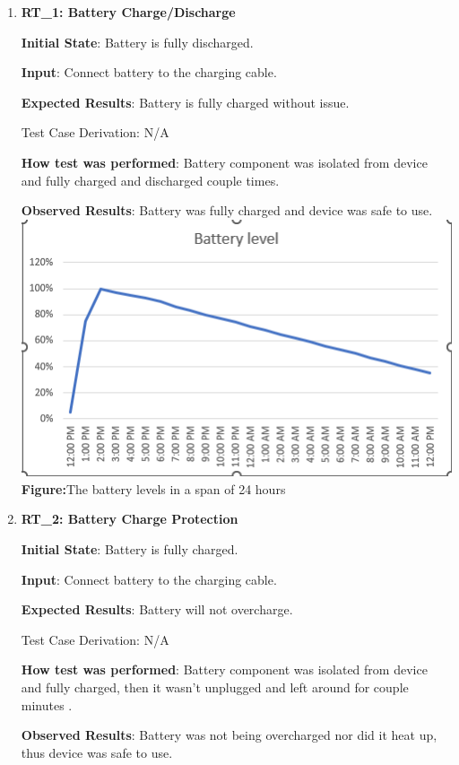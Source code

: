 \documentclass[12pt, titlepage]{article}
\begin{document}
\begin{enumerate}


  \item{\textbf{RT\_1: Battery Charge/Discharge}}\label{RT1}

  \textbf{Initial State}: Battery is fully discharged.

  \textbf{Input}: Connect battery to the charging cable.

  \textbf{Expected Results}: Battery is fully charged without issue.

  Test Case Derivation: N/A

  \textbf{How test was performed}: Battery component was isolated from device and fully charged and discharged couple times.

  \textbf{Observed Results}: Battery was fully charged and device was safe to use.\\
  \includegraphics{battery_level}
  \\\textbf{Figure:}The battery levels in a span of 24 hours

  \item{\textbf{RT\_2: Battery Charge Protection}}\label{RT2}

  \textbf{Initial State}: Battery is fully charged.

  \textbf{Input}: Connect battery to the charging cable.

  \textbf{Expected Results}: Battery will not overcharge.

  Test Case Derivation: N/A

  \textbf{How test was performed}: Battery component was isolated from device and fully charged, then it wasn't unplugged and left around for couple minutes .

  \textbf{Observed Results}: Battery was not being overcharged nor did it heat up, thus device was safe to use.

\end{enumerate}
\end{document}

